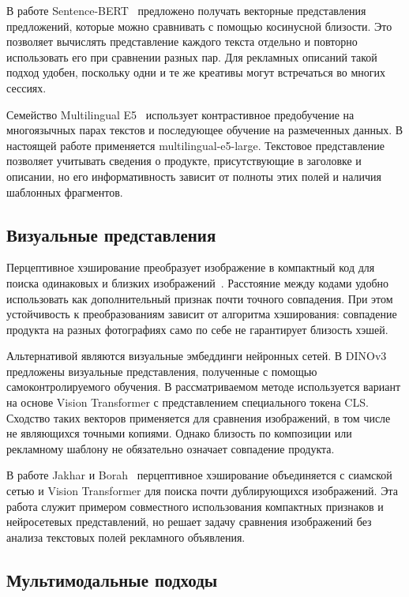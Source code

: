 \documentclass{misisarticle}
\begin{document}
В работе Sentence-BERT~\cite{sbert} предложено получать векторные представления предложений, которые можно сравнивать с помощью косинусной близости. Это позволяет вычислять представление каждого текста отдельно и повторно использовать его при сравнении разных пар. Для рекламных описаний такой подход удобен, поскольку одни и те же креативы могут встречаться во многих сессиях.

Семейство Multilingual E5~\cite{e5} использует контрастивное предобучение на многоязычных парах текстов и последующее обучение на размеченных данных. В настоящей работе применяется multilingual-e5-large. Текстовое представление позволяет учитывать сведения о продукте, присутствующие в заголовке и описании, но его информативность зависит от полноты этих полей и наличия шаблонных фрагментов.

\subsection{Визуальные представления}

Перцептивное хэширование преобразует изображение в компактный код для поиска одинаковых и близких изображений~\cite{hashing}. Расстояние между кодами удобно использовать как дополнительный признак почти точного совпадения. При этом устойчивость к преобразованиям зависит от алгоритма хэширования: совпадение продукта на разных фотографиях само по себе не гарантирует близость хэшей.

Альтернативой являются визуальные эмбеддинги нейронных сетей. В DINOv3~\cite{dinov3} предложены визуальные представления, полученные с помощью самоконтролируемого обучения. В рассматриваемом методе используется вариант на основе Vision Transformer с представлением специального токена CLS. Сходство таких векторов применяется для сравнения изображений, в том числе не являющихся точными копиями. Однако близость по композиции или рекламному шаблону не обязательно означает совпадение продукта.

В работе Jakhar и Borah~\cite{near_duplicates} перцептивное хэширование объединяется с сиамской сетью и Vision Transformer для поиска почти дублирующихся изображений. Эта работа служит примером совместного использования компактных признаков и нейросетевых представлений, но решает задачу сравнения изображений без анализа текстовых полей рекламного объявления.

\subsection{Мультимодальные подходы}
\end{document}
